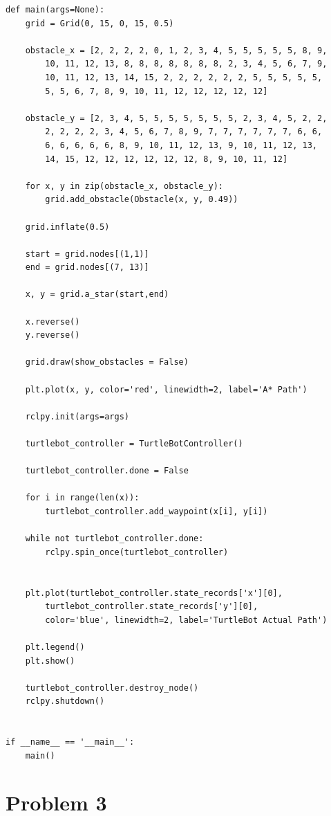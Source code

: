\documentclass{article}
\begin{document}
\begin{verbatim}
def main(args=None):
    grid = Grid(0, 15, 0, 15, 0.5)

    obstacle_x = [2, 2, 2, 2, 0, 1, 2, 3, 4, 5, 5, 5, 5, 5, 8, 9, 
        10, 11, 12, 13, 8, 8, 8, 8, 8, 8, 8, 2, 3, 4, 5, 6, 7, 9,
        10, 11, 12, 13, 14, 15, 2, 2, 2, 2, 2, 2, 5, 5, 5, 5, 5,
        5, 5, 6, 7, 8, 9, 10, 11, 12, 12, 12, 12, 12]

    obstacle_y = [2, 3, 4, 5, 5, 5, 5, 5, 5, 5, 2, 3, 4, 5, 2, 2,
        2, 2, 2, 2, 3, 4, 5, 6, 7, 8, 9, 7, 7, 7, 7, 7, 7, 6, 6,
        6, 6, 6, 6, 6, 8, 9, 10, 11, 12, 13, 9, 10, 11, 12, 13,
        14, 15, 12, 12, 12, 12, 12, 12, 8, 9, 10, 11, 12]

    for x, y in zip(obstacle_x, obstacle_y):
        grid.add_obstacle(Obstacle(x, y, 0.49))
    
    grid.inflate(0.5)

    start = grid.nodes[(1,1)]
    end = grid.nodes[(7, 13)]

    x, y = grid.a_star(start,end)

    x.reverse()
    y.reverse()

    grid.draw(show_obstacles = False)

    plt.plot(x, y, color='red', linewidth=2, label='A* Path')
    
    rclpy.init(args=args)

    turtlebot_controller = TurtleBotController()

    turtlebot_controller.done = False
    
    for i in range(len(x)):
        turtlebot_controller.add_waypoint(x[i], y[i])
    
    while not turtlebot_controller.done:
        rclpy.spin_once(turtlebot_controller)
    

    plt.plot(turtlebot_controller.state_records['x'][0], 
        turtlebot_controller.state_records['y'][0], 
        color='blue', linewidth=2, label='TurtleBot Actual Path')
    
    plt.legend()
    plt.show()
    
    turtlebot_controller.destroy_node()
    rclpy.shutdown()


if __name__ == '__main__':
    main()

\end{verbatim}



\section*{Problem 3}
\end{document}
